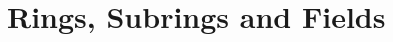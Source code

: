 \documentclass[a4paper]{report}
\begin{document}
\maketitle
\tableofcontents
\setcounter{section}{0}


\chapter{Rings, Subrings and Fields}

\end{document}
